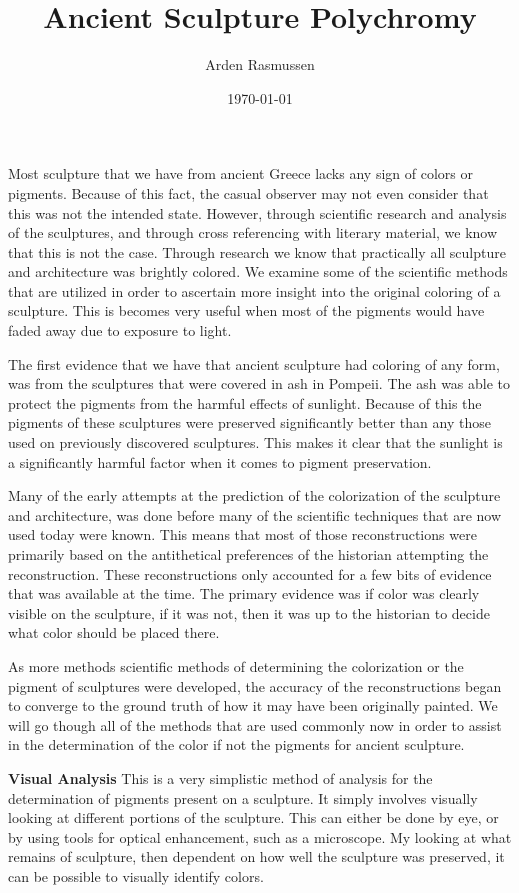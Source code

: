 \documentclass[10pt]{armath}
\title{Ancient Sculpture Polychromy}
\author{Arden Rasmussen}
\date{\today}
\begin{document}
\maketitle

Most sculpture that we have from ancient Greece lacks any sign of colors or
pigments. Because of this fact, the casual observer may not even consider that
this was not the intended state. However, through scientific research and
analysis of the sculptures, and through cross referencing with literary
material, we know that this is not the case. Through research we know that
practically all sculpture and architecture was brightly colored. We examine
some of the scientific methods that are utilized in order to ascertain more
insight into the original coloring of a sculpture. This is becomes very useful
when most of the pigments would have faded away due to exposure to light.

The first evidence that we have that ancient sculpture had coloring of any
form, was from the sculptures that were covered in ash in Pompeii. The ash was
able to protect the pigments from the harmful effects of sunlight. Because of
this the pigments of these sculptures were preserved significantly better than
any those used on previously discovered sculptures. This makes it clear that
the sunlight is a significantly harmful factor when it comes to pigment
preservation.

Many of the early attempts at the prediction of the colorization of the
sculpture and architecture, was done before many of the scientific techniques
that are now used today were known. This means that most of those
reconstructions were primarily based on the antithetical preferences of the
historian attempting the reconstruction. These reconstructions only accounted
for a few bits of evidence that was available at the time. The primary evidence
was if color was clearly visible on the sculpture, if it was not, then it was
up to the historian to decide what color should be placed there.

As more methods scientific methods of determining the colorization or the
pigment of sculptures were developed, the accuracy of the reconstructions began
to converge to the ground truth of how it may have been originally painted. We
will go though all of the methods that are used commonly now in order to assist
in the determination of the color if not the pigments for ancient sculpture.

\textbf{Visual Analysis} This is a very simplistic method of analysis for the
determination of pigments present on a sculpture. It simply involves visually
looking at different portions of the sculpture. This can either be done by eye,
or by using tools for optical enhancement, such as a microscope. My looking at
what remains of sculpture, then dependent on how well the sculpture was
preserved, it can be possible to visually identify colors.
\end{document}
